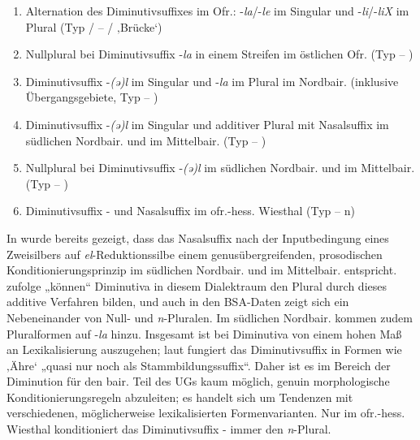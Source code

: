 \begin{enumerate}[label=(\arabic*)]
\item Alternation des Diminutivsuffixes im Ofr.: -\textit{la}/-\textit{le} im Singular und -\textit{li}/-\textit{liX} im Plural (Typ / -- / ‚Brücke‘)
\item Nullplural bei Diminutivsuffix -\textit{la} in einem Streifen im östlichen Ofr. (Typ  -- )
\item Diminutivsuffix -\textit{(ə)l} im Singular und -\textit{la} im Plural im Nordbair. (inklusive Übergangsgebiete, Typ  -- )
\item Diminutivsuffix -\textit{(ə)l} im Singular und additiver Plural mit Nasalsuffix im südlichen Nordbair. und im Mittelbair. (Typ  -- )
\item Nullplural bei Diminutivsuffix -\textit{(ə)l} im südlichen Nordbair. und im Mittelbair. (Typ  -- )
\item Diminutivsuffix - und Nasalsuffix im ofr.-hess. Wiesthal (Typ  -- n)
\end{enumerate}

In  wurde bereits gezeigt, dass das Nasalsuffix nach der Inputbedingung eines Zweisilbers auf \textit{el}{}-Reduktionssilbe einem genusübergreifenden, prosodischen Konditionierungsprinzip im südlichen Nordbair. und im Mittelbair. entspricht. \citet[154]{Rowley1997} zufolge „können“ Diminutiva in diesem Dialektraum den Plural durch dieses additive Verfahren bilden, und auch in den BSA-Daten zeigt sich ein Nebeneinander von Null- und \textit{n}{}-Pluralen. Im südlichen Nordbair. kommen zudem Pluralformen auf -\textit{la} hinzu. Insgesamt ist bei Diminutiva von einem hohen Maß an Lexikalisierung auszugehen; laut \citet[111]{Rowley1997} fungiert das Diminutivsuffix in Formen wie  ‚Ähre‘ „quasi nur noch als Stammbildungssuffix“. Daher ist es im Bereich der Diminution für den bair. Teil des UGs kaum möglich, genuin morphologische Konditionierungsregeln abzuleiten; es handelt sich um Tendenzen mit verschiedenen, möglicherweise lexikalisierten Formenvarianten. Nur im ofr.-hess. Wiesthal konditioniert das Diminutivsuffix - immer den \textit{n}{}-Plural.

